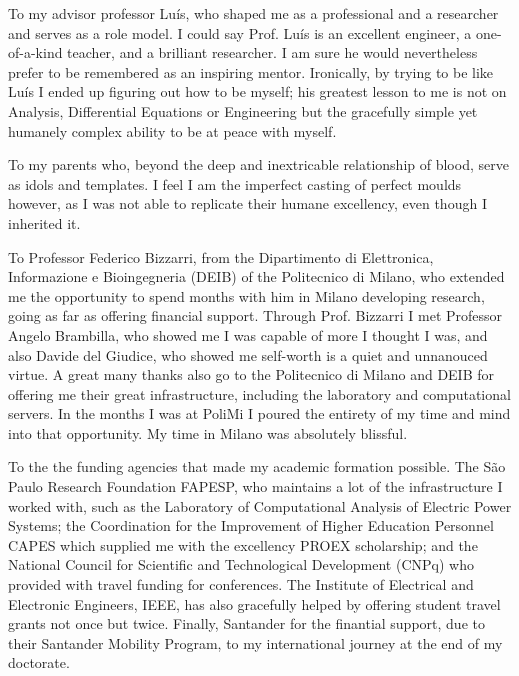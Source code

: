 \documentclass{apaThesis}
\begin{document}
\begin{acknowledgements}

	To my advisor professor Luís, who shaped me as a professional and a researcher and serves as a role model. I could say Prof. Luís is an excellent engineer, a one-of-a-kind teacher, and a brilliant researcher. I am sure he would nevertheless prefer to be remembered as an inspiring mentor. Ironically, by trying to be like Luís I ended up figuring out how to be myself; his greatest lesson to me is not on Analysis, Differential Equations or Engineering but the gracefully simple yet humanely complex ability to be at peace with myself.

	To my parents who, beyond the deep and inextricable relationship of blood, serve as idols and templates. I feel I am the imperfect casting of perfect moulds however, as I was not able to replicate their humane excellency, even though I inherited it.
	
	To Professor Federico Bizzarri, from the Dipartimento di Elettronica, Informazione e Bioingegneria (DEIB) of the Politecnico di Milano, who extended me the opportunity to spend months with him in Milano developing research, going as far as offering financial support. Through Prof. Bizzarri I met Professor Angelo Brambilla, who showed me I was capable of more I thought I was, and also Davide del Giudice, who showed me self-worth is a quiet and unnanouced virtue. A great many thanks also go to the Politecnico di Milano and DEIB for offering me their great infrastructure, including the laboratory and computational servers. In the months I was at PoliMi I poured the entirety of my time and mind into that opportunity. My time in Milano was absolutely blissful.

	To the the funding agencies that made my academic formation possible. The São Paulo Research Foundation FAPESP, who maintains a lot of the infrastructure I worked with, such as the Laboratory of Computational Analysis of Electric Power Systems; the Coordination for the Improvement of Higher Education Personnel CAPES which supplied me with the excellency PROEX scholarship; and the National Council for Scientific and Technological Development (CNPq) who provided with travel funding for conferences. The Institute of Electrical and Electronic Engineers, IEEE, has also gracefully helped by offering student travel grants not once but twice. Finally, Santander for the finantial support, due to their Santander Mobility Program, to my international journey at the end of my doctorate.


\end{acknowledgements}
\end{document}
